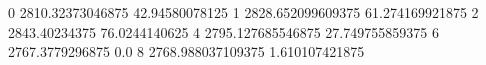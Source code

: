 0 2810.32373046875 42.94580078125
1 2828.652099609375 61.274169921875
2 2843.40234375 76.0244140625
4 2795.127685546875 27.749755859375
6 2767.3779296875 0.0
8 2768.988037109375 1.610107421875
